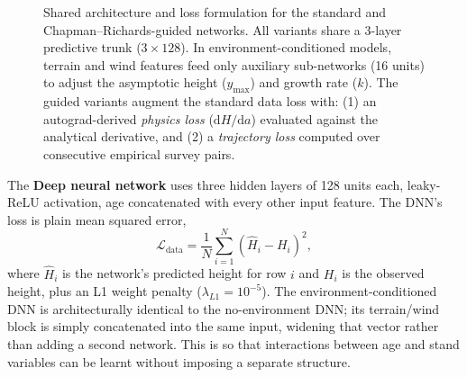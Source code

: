 \documentclass[11pt,a4paper]{report}
\begin{document}
\begin{figure}[!htbp]
\centering
{}
\caption{Shared architecture and loss formulation for the standard and Chapman--Richards-guided networks. All variants share a 3-layer predictive trunk ($3 \times 128$). In environment-conditioned models, terrain and wind features feed only auxiliary sub-networks (16 units) to adjust the asymptotic height ($y_{\max}$) and growth rate ($k$). The guided variants augment the standard data loss with: (1) an autograd-derived \emph{physics loss} ($\mathrm{d}H/\mathrm{d}a$) evaluated against the analytical derivative, and (2) a \emph{trajectory loss} computed over consecutive empirical survey pairs.}
\label{fig:model-architecture}
\end{figure}

The \textbf{Deep neural network} uses three hidden layers of 128 units each, leaky-ReLU activation, age concatenated with every other
input feature. The DNN's loss is plain mean squared error,
\begin{equation}
\mathcal{L}_{\text{data}} = \frac{1}{N}\sum_{i=1}^{N}\left(\hat H_i - H_i\right)^2,
\label{eq:data-loss}
\end{equation}
where $\hat H_i$ is the network's predicted height for row $i$ and $H_i$ is the observed height,
plus an L1 weight penalty ($\lambda_{L1}=10^{-5}$). The environment-conditioned DNN is
architecturally identical to the no-environment DNN; its terrain/wind block is simply concatenated
into the same input, widening that vector rather than adding a second network. This is so that interactions between age and stand variables can be learnt without imposing a separate structure.
\end{document}

